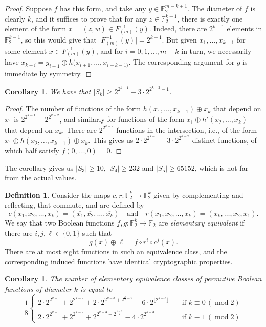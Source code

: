 \documentclass[11pt,english,a4paper]{amsart}
\theoremstyle{plain}
\newtheorem{corollary}[theorem]{Corollary}
\theoremstyle{definition}
\newtheorem{definition}[theorem]{Definition}
\theoremstyle{remark}
\newcommand{\F}{\mathbb{F}}
\begin{document}
	\begin{proof}
		Suppose $f$ has this form, and take any $y \in \F_2^{m-k+1}$. The diameter of $f$ is clearly $k$, and it suffices to prove that for any $z\in \F_2^{k-1}$, there is exactly one element of the form $x=(z,w) \in  F_{(m)}^{-1}(y)$. Indeed, there are $2^{k-1}$ elements in $\F_2^{k-1}$, so this would give that $\lvert F_{(m)}^{-1}(y)\rvert=2^{k-1}$. But given $x_1, \dotsc, x_{k-1}$ for some element $x \in F_{(m)}^{-1}(y)$, and for $i=0, 1, \dotsc, m-k$ in turn, we necessarily have $x_{k + i} = y_{i + 1} \oplus h(x_{i + 1}, \dotsc, x_{i + k - 1)}$. The corresponding argument for $g$ is immediate by symmetry.
	\end{proof}

	\begin{corollary}
		We have that $\lvert S_k\rvert \geq 2^{2^{k-1}}-3 \cdot 2^{2^{k-2}-1}$.
	\end{corollary}
	
	\begin{proof}
		The number of functions of the form $h(x_1, \dotsc, x_{k-1}) \oplus x_k$ that depend on $x_1$ is $2^{2^{k-1}} - 2^{2^{k-2}}$, and similarly for functions of the form $x_1 \oplus h'(x_2, \dotsc, x_k)$ that depend on $x_k$. There are $2^{2^{k-2}}$ functions in the intersection, i.e., of the form $x_1 \oplus h(x_2, \dotsc,  x_{k-1}) \oplus x_k$. This gives us $2 \cdot 2^{2^{k-1}} - 3 \cdot 2^{2^{k-2}}$ distinct functions, of which half satisfy $f(0,\dotsc, 0) = 0$.
	\end{proof}
	
	The corollary gives us $\lvert S_3\rvert \geq 10$, $\lvert S_4\rvert \geq 232$ and $\lvert S_5\rvert \geq 65152$, which is not far from the actual values.

	\begin{definition}
		Consider the maps $c,r\colon \F_2^k\to\F_2^k$ given by complementing and reflecting, that commute, and are defined by
		\[
		c(x_1,x_2,\dotsc,x_k)=(\overline{x_1},\overline{x_2},\dotsc,\overline{x_k}) \quad\text{and}\quad
		r(x_1,x_2,\dotsc,x_k)=(x_k,\dotsc,x_2,x_1).
		\]
		We say that two Boolean functions $f,g\colon\F_2^k\to\F_2$ are \emph{elementary equivalent} if there are $i,j,\ell\in\{0,1\}$ such that
		\[
		g(x)\oplus \ell=f\circ r^i\circ c^j(x).
		\]
		There are at most eight functions in such an equivalence class, and the corresponding induced functions have identical cryptographic properties.
	\end{definition}

    \begin{corollary}\label{permutive-bound}
    The number of elementary equivalence classes of permutive Boolean functions of diameter $k$ is equal to
    \[
    \frac{1}{8}
    \begin{cases}
        2 \cdot 2^{2^{k-1}} + 2^{2^{k-2}} + 2 \cdot 2^{2^{k-3} + 2^{\frac{k}{2}-2}} - 6 \cdot 2^{\lfloor 2^{k-3} \rfloor} &\quad\text{if }k \equiv 0\, (\operatorname{mod} 2)\\
        2 \cdot 2^{2^{k-1}} + 2^{2^{k-2}} + 2^{2^{k-3} + 2^{\frac{k-3}{2}}} - 4 \cdot 2^{2^{k-3}} &\quad\text{if }k \equiv 1\, (\operatorname{mod} 2)
    \end{cases}
    \]
    \end{corollary}
\end{document}
